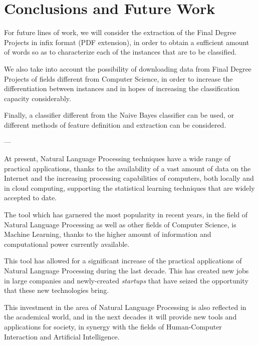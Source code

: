 \section{Conclusions and Future Work}

For future lines of work, we will consider the extraction of the Final Degree Projects in infix format (PDF extension), in order to obtain a sufficient amount of words so as to characterize each of the instances that are to be classified.

We also take into account the possibility of downloading data from Final Degree Projects of fields different from Computer Science, in order to increase the differentiation between instances and in hopes of increasing the classification capacity considerably.

Finally, a classifier different from the Naive Bayes classifier can be used, or different methods of feature definition and extraction can be considered.

---

At present, Natural Language Processing techniques have a wide range of practical applications, thanks to the availability of a vast amount of data on the Internet and the increasing processing capabilities of computers, both locally and in cloud computing, supporting the statistical learning techniques that are widely accepted to date.

The tool which has garnered the most popularity in recent years, in the field of Natural Language Processing as well as other fields of Computer Science, is Machine Learning, thanks to the higher amount of information and computational power currently available.

This tool has allowed for a significant increase of the practical applications of Natural Language Processing during the last decade. This has created new jobs in large companies and newly-created \textit{startups} that have seized the opportunity that these new technologies bring.

This investment in the area of Natural Language Processing is also reflected in the academical world, and in the next decades it will provide new tools and applications for society, in synergy with the fields of Human-Computer Interaction and Artificial Intelligence.